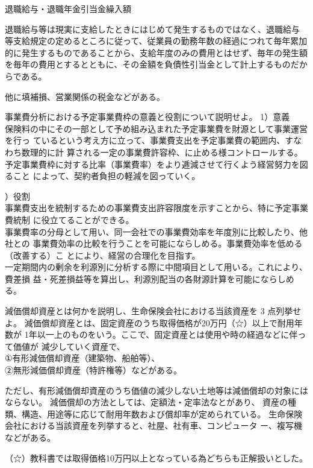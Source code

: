 \documentclass[report,gutter=10mm,fore-edge=10mm,uplatex,dvipdfmx]{jlreq}
\begin{document}
\noindent 退職給与・退職年金引当金繰入額

退職給与等は現実に支給したときにはじめて発生するものではなく、退職給与
等支給規定の定めるところに従って、従業員の勤務年数の経過につれて毎年累加
的に発生するものであることから、支給年度のみの費用とはせず、毎年の発生額
を毎年の費用とするとともに、その金額を負債性引当金として計上するものだか
らである。

他に填補損、営業関係の税金などがある。

事業費分析における予定事業費枠の意義と役割について説明せよ。
\answer{}
\noindent{} 1）意義\\
保険料の中にその一部として予め組み込まれた予定事業費を財源として事業運営を行っ
ているという考え方に立って、事業費支出を予定事業費の範囲内、すなわち数理的に計
算される一定の事業費許容枠、に止める様コントロールする。\\
予定事業費枠に対する比率（事業費率）をより逓減させて行くよう経営努力を図ること
によって、契約者負担の軽減を図っていく。

）役割\\
事業費支出を統制するための事業費支出許容限度を示すことから、特に予定事業費統制
に役立てることができる。\\
事業費率の分母として用い、同一会社での事業費効率を年度別に比較したり、他社との
事業費効率の比較を行うことを可能にならしめる。事業費効率を低める（改善する）こ
とにより、経営の合理化を目指す。\\
一定期間内の剰余を利源別に分析する際に中間項目として用いる。これにより、費差損
益・死差損益等を算出し、利源別配当の各財源計算を可能にならしめる。

減価償却資産とは何かを説明し、生命保険会社における当該資産を 3 点列挙せよ。
\answer{}
減価償却資産とは、固定資産のうち取得価格が20万円（☆）以上で耐用年数が
1年以一上のものをいう。ここで、固定資産とは使用や時の経過などに伴って価値が
減少していく資産で、\\
①有形減価償却資産（建築物、船舶等）、\\
②無形減価償却資産（特許権等）などがある。

ただし、有形減価償却資産のうち価値の減少しない土地等は減価償却の対象にはならない。
減価償却の方法としては、定額法・定率法なとがあり、
資産の種類、構造、用途等に応じて耐用年数および償却率が定められている。
生命保険会社における当該資産を列挙すると、社屋、社有車、コンピュータ
ー、複写機などがある。

（☆）教科書では取得価格10万円以上となっている為どちらも正解扱いとした。
\end{document}

